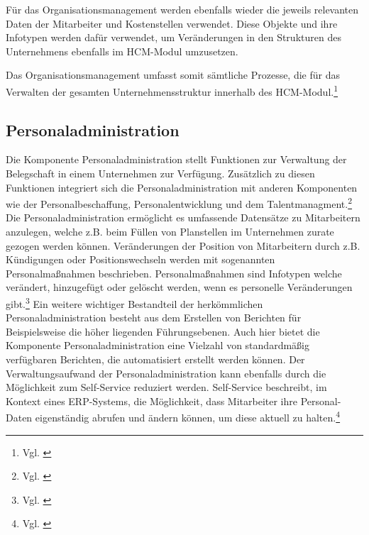 Für das Organisationsmanagement werden ebenfalls wieder die jeweils relevanten Daten der Mitarbeiter und Kostenstellen verwendet. 
Diese Objekte und ihre Infotypen werden dafür verwendet, um Veränderungen in den Strukturen des Unternehmens ebenfalls im HCM-Modul umzusetzen.

Das Organisationsmanagement umfasst somit sämtliche Prozesse, die für das Verwalten der gesamten Unternehmensstruktur innerhalb des HCM-Modul.\footnote{Vgl. \cite{SAPSE2024a}}

\subsection{Personaladministration}
Die Komponente Personaladministration stellt Funktionen zur Verwaltung der Belegschaft in einem Unternehmen zur Verfügung. 
Zusätzlich zu diesen Funktionen integriert sich die Personaladministration mit anderen Komponenten wie der Personalbeschaffung, Personalentwicklung und dem Talentmanagment.\footnote{Vgl. \cite{SAPSE2022}}
Die Personaladministration ermöglicht es umfassende Datensätze zu Mitarbeitern anzulegen, welche z.B. beim Füllen von Planstellen im Unternehmen zurate gezogen werden können. Veränderungen
der Position von Mitarbeitern durch z.B. Kündigungen oder Positionswechseln werden mit sogenannten Personalmaßnahmen beschrieben. 
Personalmaßnahmen sind Infotypen welche verändert, hinzugefügt oder gelöscht werden, wenn es personelle Veränderungen gibt.\footnote{Vgl. \cite{SAPSE2023a}}
Ein weitere wichtiger Bestandteil der herkömmlichen Personaladministration besteht aus dem Erstellen von Berichten für Beispielsweise die höher liegenden Führungsebenen. 
Auch hier bietet die Komponente Personaladministration eine Vielzahl von standardmäßig verfügbaren Berichten, die automatisiert erstellt werden können.
Der Verwaltungsaufwand der Personaladministration kann ebenfalls durch die Möglichkeit zum Self-Service reduziert werden. 
Self-Service beschreibt, im Kontext eines ERP-Systems, die Möglichkeit, dass Mitarbeiter ihre Personal-Daten eigenständig abrufen und ändern können, um diese aktuell zu halten.\footnote{Vgl. \cite{SAPSE2023}}

